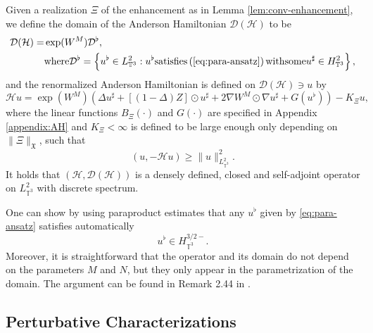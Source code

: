 \begin{prop}
  \label{prop:construction-AH}Given a realization $\Xi$ of the enhancement as
  in Lemma \ref{lem:conv-enhancement}, we define the domain of the Anderson
  Hamiltonian $\mathcal{D} (\mathcal{H})$ to be
  \begin{equation}
  \begin{split}
    \mathcal{D} (\mathcal{H}) = & \exp (W^M) \mathcal{D}^{\flat}, \\
    & \mathrm{where }\mathcal{D}^{\flat} = \left\{ u^{\flat} \in L_{\mathbb{T}^3}^2 : u^{\flat}
    \mathrm{satisfies} \left( \ref{eq:para-ansatz} \right) \mathrm{with}
    \mathrm{some} u^{\sharp} \in H_{\mathbb{T}^3}^2 \right\},
    \end{split}
  \end{equation}
  and the renormalized Anderson Hamiltonian is defined on $\mathcal{D}
  (\mathcal{H}) \ni u$ by
  \begin{equation}
    \mathcal{H} u = \exp (W^M) (\Delta u^{\sharp} + [(1 - \Delta) Z] \odot
    u^{\sharp} + 2 \nabla W^M \odot \nabla u^{\sharp} + G (u^{\flat})) -
    K_{\Xi} u,
  \end{equation}
  where the linear functions $B_{\Xi} (\cdot)$ and $G (\cdot)$ are specified
  in Appendix \ref{appendix:AH} and $K_{\Xi} < \infty$ is defined to be large
  enough only depending on $\| \Xi \|_{\mathfrak{X}}$, such that
  \begin{equation}
    (u, - \mathcal{H} u) \geqslant \| u \|^2_{L_{\mathbb{T}^3}^2} .
    \label{ineq:specgap}
  \end{equation}
  It holds that $(\mathcal{H}, \mathcal{D} (\mathcal{H}))$ is a densely
  defined, closed and self-adjoint operator on $L_{\mathbb{T}^3}^2$ with
  discrete spectrum.
\end{prop}


One can show by using paraproduct estimates that any $u^{\flat}$ given by
\eqref{eq:para-ansatz} satisfies automatically
\[
u^{\flat} \in H_{\mathbb{T}^3}^{3 / 2 -}.
\] 
Moreover, it is straightforward that the
  operator and its domain do not depend on the parameters $M$ and $N$, but
  they only appear in the parametrization of the domain. The argument can be
  found in Remark 2.44 in {\cite{GUZ20}}.

\subsection{Perturbative
Characterizations}\label{sec:perturb-AH-characterization}


